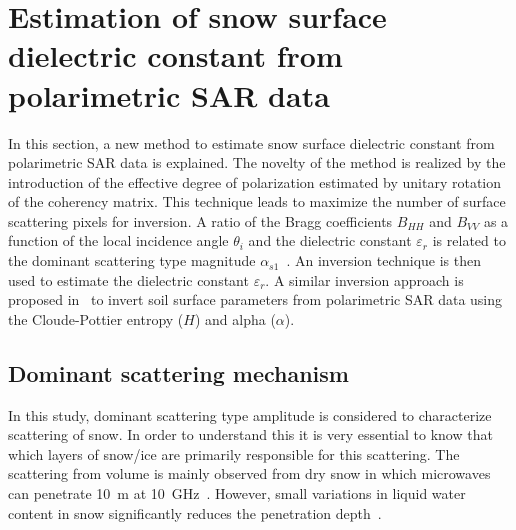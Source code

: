 \section{Estimation of snow surface dielectric constant from polarimetric SAR data}
\label{sec:3.3}
In this section, a new method to estimate snow surface dielectric constant from polarimetric SAR data is explained. The novelty of the method is realized by the introduction of the effective degree of polarization estimated by unitary rotation of the coherency matrix. This technique leads to maximize the number of surface scattering pixels for inversion.  A ratio of the Bragg coefficients $B_{HH}$ and $B_{VV}$ as a function of the local incidence angle $\theta_{i}$ and the dielectric constant $\varepsilon_{r}$ is related to the dominant scattering type magnitude $\alpha_{s1}$~\citep{TOUZI2007}. An inversion technique is then used to estimate the dielectric constant $\varepsilon_{r}$. A similar inversion approach is proposed in~\citep{Hajnsek2003} to invert soil surface parameters from polarimetric SAR data using the Cloude-Pottier entropy ($H$) and alpha ($\alpha$).

\subsection{Dominant scattering mechanism}
In this study, dominant scattering type amplitude is considered to characterize scattering of snow. In order to understand this it is very essential to know that which layers of snow/ice are primarily responsible for this scattering. The scattering from volume is mainly observed from dry snow in which microwaves can penetrate 10~m at 10~GHz~\citep{rott1987possibilities}. However, small variations in liquid water content in snow significantly reduces the penetration depth~\citep{rott1987possibilities,rott1995monitoring}. 

